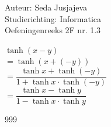 \documentclass[a4paper]{article}
\begin{document}
\noindent \large Auteur: Seda Jusjajeva\\
\noindent \large Studierichting: Informatica\\
\noindent \large Oefeningenreeks 2F nr. 1.3 \\

\medskip

\normalsize


$\tanh(x - y)$ \\

$= \tanh(x + (-y))$ \\

$= \dfrac{\tanh x + \tanh (-y)}{1 + \tanh x \cdot \tanh (-y)}$ \\

$= \dfrac{\tanh x - \tanh y}{1 - \tanh x \cdot \tanh y}$ \\



\begin{thebibliography}{999}
\end{thebibliography}
\end{document}
